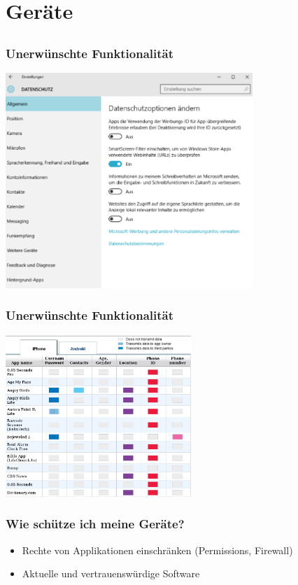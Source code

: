 \documentclass[12pt, xcolor={svgnames,table}]{beamer}
\begin{document}
\section{Geräte}
\subsection{}

\begin{frame}
    \frametitle{Unerwünschte Funktionalität}
    \begin{center}
      \includegraphics[width=0.7\textwidth]{img/windows10.png}
    \end{center}
\end{frame}

\begin{frame}
  \frametitle{Unerwünschte Funktionalität}
  \begin{center}
    \includegraphics[width=7cm]{img/backdoor-apps}
  \par\end{center}
\end{frame}

\begin{frame}
    \frametitle{Wie schütze ich meine Geräte?}
    \begin{itemize}
      \item Rechte von Applikationen einschränken (Permissions, Firewall)
      \item Aktuelle und vertrauenswürdige Software
    \end{itemize}
\end{frame}
\end{document}
